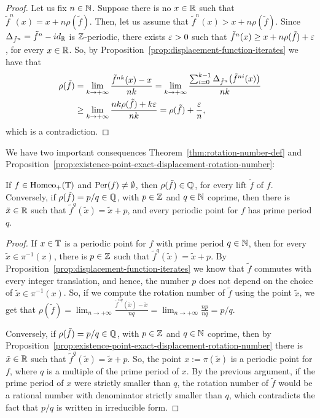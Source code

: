 \begin{proof}
  Let us fix $n\in\mathbb{N}$. Suppose there is no $x\in\mathbb{R}$ such that $\tilde f^n(x)=x+n\rho(\tilde f)$. Then, let us assume that $\tilde f^n(x)>x+n\rho(\tilde f)$. Since $\Delta_{\tilde f^n}=\tilde f^n-id_{\mathbb{R}}$ is $\mathbb{Z}$-periodic, there exists $\varepsilon>0$ such that $\tilde f^n(x)\geq x+n\rho(\tilde f)+\varepsilon$, for every $x\in\mathbb{R}$. So, by Proposition~\ref{prop:displacement-function-iterates} we have that
  \begin{displaymath}
    \begin{split}
      \rho(\tilde f)&=\lim_{k\to+\infty} \frac{\tilde f^{nk}(x)-x}{nk} =\lim_{k\to+\infty} \frac{\sum_{i=0}^{k-1} \Delta_{\tilde f^n}\big(\tilde f^{ni}(x)\big)}{nk} \\
                    &\geq \lim_{k\to+\infty} \frac{nk\rho(\tilde f)+k\varepsilon}{nk}=\rho(\tilde f)+\frac{\varepsilon}{n},
    \end{split}
  \end{displaymath}
  which is a contradiction.
\end{proof}

We have two important consequences Theorem~\ref{thm:rotation-number-def} and Proposition~\ref{prop:existence-point-exact-displacement-rotation-number}:

\begin{corollary}
  \label{cor:rational-rotation-number-periodic-point}
  If $f\in\mathrm{Homeo}_{+}(\mathbb{T})$ and $\operatorname{Per}(f)\neq\emptyset$, then $\rho(\tilde f)\in\mathbb{Q}$, for every lift $\tilde f$ of $f$. Conversely, if $\rho(\tilde f)=p/q\in\mathbb{Q}$, with $p\in\mathbb{Z}$ and $q\in\mathbb{N}$ coprime, then there is $\tilde x\in\mathbb{R}$ such that $\tilde f^q(\tilde x)=\tilde x+p$, and every periodic point for $f$ has prime period $q$.
\end{corollary}

\begin{proof}
  If $x\in\mathbb{T}$ is a periodic point for $f$ with prime period $q\in\mathbb{N}$, then for every $\tilde x\in\pi^{-1}(x)$, there is $p\in\mathbb{Z}$ such that $\tilde f^q(\tilde x)=\tilde x+p$. By Proposition~\ref{prop:displacement-function-iterates} we know that $\tilde f$ commutes with every integer translation, and hence, the number $p$ does not depend on the choice of $\tilde x\in\pi^{-1}(x)$. So, if we compute the rotation number of $\tilde f$ using the point $\tilde x$, we get that $\rho(\tilde f)=\lim_{n\to+\infty} \frac{\tilde f^{nq}(\tilde x)-\tilde x}{nq}=\lim_{n\to+\infty} \frac{np}{nq}=p/q$.

  Conversely, if $\rho(\tilde f)=p/q\in\mathbb{Q}$, with $p\in\mathbb{Z}$ and $q\in\mathbb{N}$ coprime, then by Proposition~\ref{prop:existence-point-exact-displacement-rotation-number} there is $\tilde x\in\mathbb{R}$ such that $\tilde f^q(\tilde x)=\tilde x+p$. So, the point $x:=\pi(\tilde x)$ is a periodic point for $f$, where $q$ is a multiple of the prime period of $x$. By the previous argument, if the prime period of $x$ were strictly smaller than $q$, the rotation number of $\tilde f$ would be a rational number with denominator strictly smaller than $q$, which contradicts the fact that $p/q$ is written in irreducible form.
\end{proof}

